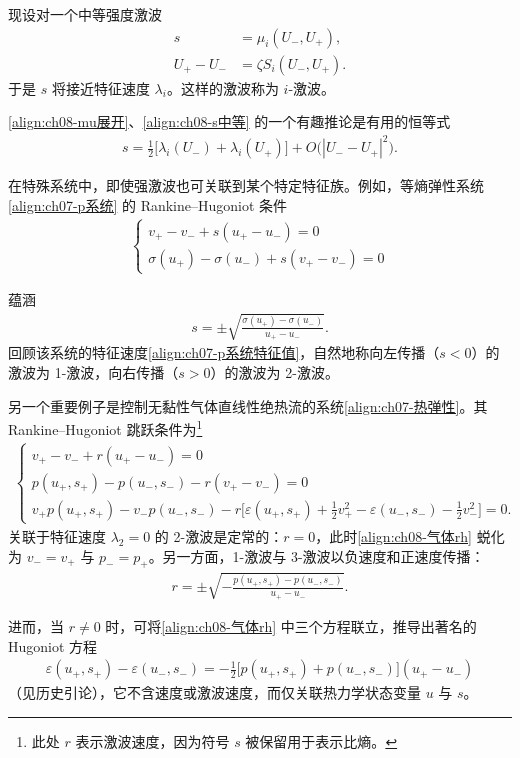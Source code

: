 \documentclass[../../main.tex]{subfiles}
\begin{document}
现设对一个中等强度激波
\begin{align}
s&=\mu_i(U_-,U_+),
\label{align:ch08-s中等}\\
U_+-U_-&=\zeta S_i(U_-,U_+).
\label{align:ch08-跳跃方向}
\end{align}
于是 $s$ 将接近特征速度 $\lambda_i$。这样的激波称为 $i$-激波。

\eqref{align:ch08-mu展开}、\eqref{align:ch08-s中等} 的一个有趣推论是有用的恒等式
\begin{align}
s=\tfrac12\big[\lambda_i(U_-)+\lambda_i(U_+)\big]+O\big(|U_--U_+|^2\big).
\label{align:ch08-s平均}
\end{align}

在特殊系统中，即使强激波也可关联到某个特定特征族。例如，等熵弹性系统\eqref{align:ch07-p系统} 的 Rankine--Hugoniot 条件
\begin{align}
\begin{cases}
v_+-v_-+s(u_+-u_-)=0\\
\sigma(u_+)-\sigma(u_-)+s(v_+-v_-)=0
\end{cases}
\label{align:ch08-弹性rh}
\end{align}

蕴涵
\begin{align}
s=\pm\sqrt{\frac{\sigma(u_+)-\sigma(u_-)}{u_+-u_-}}.
\label{align:ch08-弹性s}
\end{align}
回顾该系统的特征速度\eqref{align:ch07-p系统特征值}，自然地称向左传播（$s<0$）的激波为 1-激波，向右传播（$s>0$）的激波为 2-激波。

另一个重要例子是控制无黏性气体直线性绝热流的系统\eqref{align:ch07-热弹性}。其 Rankine--Hugoniot 跳跃条件为\footnote{此处 $r$ 表示激波速度，因为符号 $s$ 被保留用于表示比熵。}
\begin{align}
\begin{cases}
v_+-v_-+r(u_+-u_-)=0\\
p(u_+,s_+)-p(u_-,s_-)-r(v_+-v_-)=0\\
v_+p(u_+,s_+)-v_-p(u_-,s_-)-r\Big[\varepsilon(u_+,s_+)+\tfrac12 v_+^2-\varepsilon(u_-,s_-)-\tfrac12 v_-^2\Big]=0.
\end{cases}
\label{align:ch08-气体rh}
\end{align}
关联于特征速度 $\lambda_2=0$ 的 2-激波是定常的：$r=0$，此时\eqref{align:ch08-气体rh} 蜕化为 $v_-=v_+$ 与 $p_-=p_+$。另一方面，1-激波与 3-激波以负速度和正速度传播：
\begin{align}
r=\pm\sqrt{-\frac{p(u_+,s_+)-p(u_-,s_-)}{u_+-u_-}}.
\label{align:ch08-气体r}
\end{align}

进而，当 $r\neq0$ 时，可将\eqref{align:ch08-气体rh} 中三个方程联立，推导出著名的 Hugoniot 方程
\begin{align}
\varepsilon(u_+,s_+)-\varepsilon(u_-,s_-)=-\tfrac12\big[p(u_+,s_+)+p(u_-,s_-)\big](u_+-u_-)
\label{align:ch08-hugoniot方程}
\end{align}
（见历史引论），它不含速度或激波速度，而仅关联热力学状态变量 $u$ 与 $s$。
\end{document}
